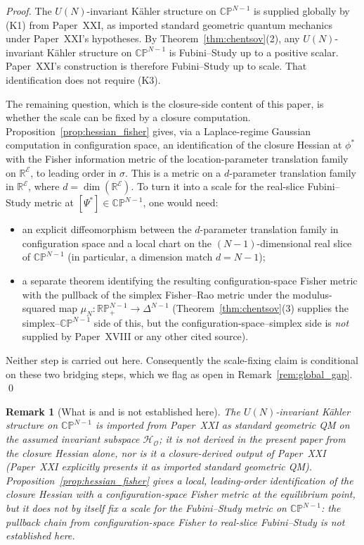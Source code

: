 \documentclass[12pt]{article}
\newtheorem{remark}[theorem]{Remark}
\newcommand{\Ecal}{\mathcal{E}}
\newcommand{\Ocal}{\mathcal{O}}
\newcommand{\Hcal}{\mathcal{H}}
\begin{document}
\begin{proof}
The $U(N)$-invariant K\"ahler structure on $\mathbb{CP}^{N-1}$ is supplied globally by (K1) from Paper~XXI, as imported standard geometric quantum mechanics under Paper~XXI's hypotheses. By Theorem~\ref{thm:chentsov}(2), any $U(N)$-invariant K\"ahler structure on $\mathbb{CP}^{N-1}$ is Fubini--Study up to a positive scalar. Paper~XXI's construction is therefore Fubini--Study up to scale. That identification does not require (K3).

The remaining question, which is the closure-side content of this paper, is whether the scale can be fixed by a closure computation. Proposition~\ref{prop:hessian_fisher} gives, via a Laplace-regime Gaussian computation in configuration space, an identification of the closure Hessian at $\phi^*$ with the Fisher information metric of the location-parameter translation family on $\mathbb{R}^\Ecal$, to leading order in $\sigma$. This is a metric on a $d$-parameter translation family in $\mathbb{R}^\Ecal$, where $d = \dim(\mathbb{R}^\Ecal)$. To turn it into a scale for the real-slice Fubini--Study metric at $[\Psi^*] \in \mathbb{CP}^{N-1}$, one would need:
\begin{itemize}
    \item an explicit diffeomorphism between the $d$-parameter translation family in configuration space and a local chart on the $(N-1)$-dimensional real slice of $\mathbb{CP}^{N-1}$ (in particular, a dimension match $d = N-1$);
    \item a separate theorem identifying the resulting configuration-space Fisher metric with the pullback of the simplex Fisher--Rao metric under the modulus-squared map $\mu_N: \mathbb{RP}^{N-1}_+ \to \Delta^{N-1}$ (Theorem~\ref{thm:chentsov}(3) supplies the simplex--$\mathbb{CP}^{N-1}$ side of this, but the configuration-space--simplex side is \emph{not} supplied by Paper~XVIII or any other cited source).
\end{itemize}
Neither step is carried out here. Consequently the scale-fixing claim is conditional on these two bridging steps, which we flag as open in Remark~\ref{rem:global_gap}. \qed
\end{proof}

\begin{remark}[What is and is not established here]\label{rem:kahler_scope}
The $U(N)$-invariant K\"ahler structure on $\mathbb{CP}^{N-1}$ is imported from Paper~XXI as standard geometric QM on the assumed invariant subspace $\Hcal_\Ocal$; it is \emph{not} derived in the present paper from the closure Hessian alone, nor is it a closure-derived output of Paper~XXI (Paper~XXI explicitly presents it as imported standard geometric QM). Proposition~\ref{prop:hessian_fisher} gives a local, leading-order identification of the closure Hessian with a configuration-space Fisher metric at the equilibrium point, but it does \emph{not} by itself fix a scale for the Fubini--Study metric on $\mathbb{CP}^{N-1}$: the pullback chain from configuration-space Fisher to real-slice Fubini--Study is not established here.
\end{remark}
\end{document}
